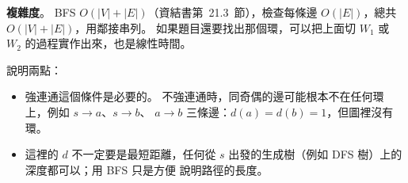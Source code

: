 \begin{pastsoln}
\textbf{複雜度}。 BFS $O(|V| + |E|)$（資結書第~21.3~節），檢查每條邊 $O(|E|)$，總共 $O(|V| + |E|)$，用鄰接串列。
如果題目還要找出那個環，可以把上面切 $W_1$ 或 $W_2$ 的過程實作出來，也是線性時間。

說明兩點：
\begin{itemize}
\item 強連通這個條件是必要的。 不強連通時，同奇偶的邊可能根本不在任何環上，例如 $s \to a$、$s \to b$、
$a \to b$ 三條邊：$d(a) = d(b) = 1$，但圖裡沒有環。
\item 這裡的 $d$ 不一定要是最短距離，任何從 $s$ 出發的生成樹（例如 DFS 樹）上的深度都可以；用 BFS 只是方便
說明路徑的長度。
\end{itemize}
\end{pastsoln}
